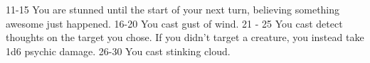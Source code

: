 11-15                                             You are stunned until the start of your next turn,  believing something awesome just happened.                                                                                                                                                                                                                                                                                                                                                                                                                                                                                                                          
16-20                                             You cast gust of wind.                                                                                                                                                                                                                                                                                                                                                                                                                                                                                                                                                                                                  
21 - 25                                           You cast detect thoughts on the target you  chose. If you didn't target a creature,  you  instead take 1d6 psychic damage.                                                                                                                                                                                                                                                                                                                                                                                                                                                                                              
26-30                                             You cast stinking cloud.                                                                                                                                                                                                                                                                                                                                                                                                                                                                                                                                                                                                
